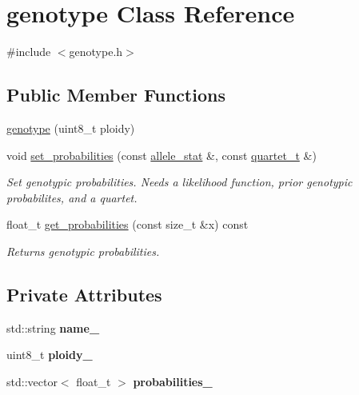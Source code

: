 \hypertarget{classgenotype}{\section{genotype Class Reference}
\label{classgenotype}
}


{\ttfamily \#include $<$genotype.\-h$>$}

\subsection*{Public Member Functions}
\begin{DoxyCompactItemize}
\item 
\hyperlink{classgenotype_af5ebf8bb0c53dca2400d58fabf82f445}{genotype} (uint8\-\_\-t ploidy)
\item 
\hypertarget{classgenotype_a81684d812333591a9c63705732a3da2b}{void \hyperlink{classgenotype_a81684d812333591a9c63705732a3da2b}{set\-\_\-probabilities} (const \hyperlink{classallele__stat}{allele\-\_\-stat} \&, const \hyperlink{structquartet}{quartet\-\_\-t} \&)}\label{classgenotype_a81684d812333591a9c63705732a3da2b}

\begin{DoxyCompactList}\small\item\em Set genotypic probabilities. Needs a likelihood function, prior genotypic probabilites, and a quartet. \end{DoxyCompactList}\item 
\hypertarget{classgenotype_a38b6d54674d32091f6b8f830319fa875}{float\-\_\-t \hyperlink{classgenotype_a38b6d54674d32091f6b8f830319fa875}{get\-\_\-probabilities} (const size\-\_\-t \&x) const }\label{classgenotype_a38b6d54674d32091f6b8f830319fa875}

\begin{DoxyCompactList}\small\item\em Returns genotypic probabilities. \end{DoxyCompactList}\end{DoxyCompactItemize}
\subsection*{Private Attributes}
\begin{DoxyCompactItemize}
\item 
\hypertarget{classgenotype_ab3d7893a970717bf92fd1ecba1ef0599}{std\-::string {\bfseries name\-\_\-}}\label{classgenotype_ab3d7893a970717bf92fd1ecba1ef0599}

\item 
\hypertarget{classgenotype_a63aa71e017f5dc138f74f2d3948b89f8}{uint8\-\_\-t {\bfseries ploidy\-\_\-}}\label{classgenotype_a63aa71e017f5dc138f74f2d3948b89f8}

\item 
\hypertarget{classgenotype_a46f37d1d7da597efbc162a00fff77052}{std\-::vector$<$ float\-\_\-t $>$ {\bfseries probabilities\-\_\-}}\label{classgenotype_a46f37d1d7da597efbc162a00fff77052}

\end{DoxyCompactItemize}


